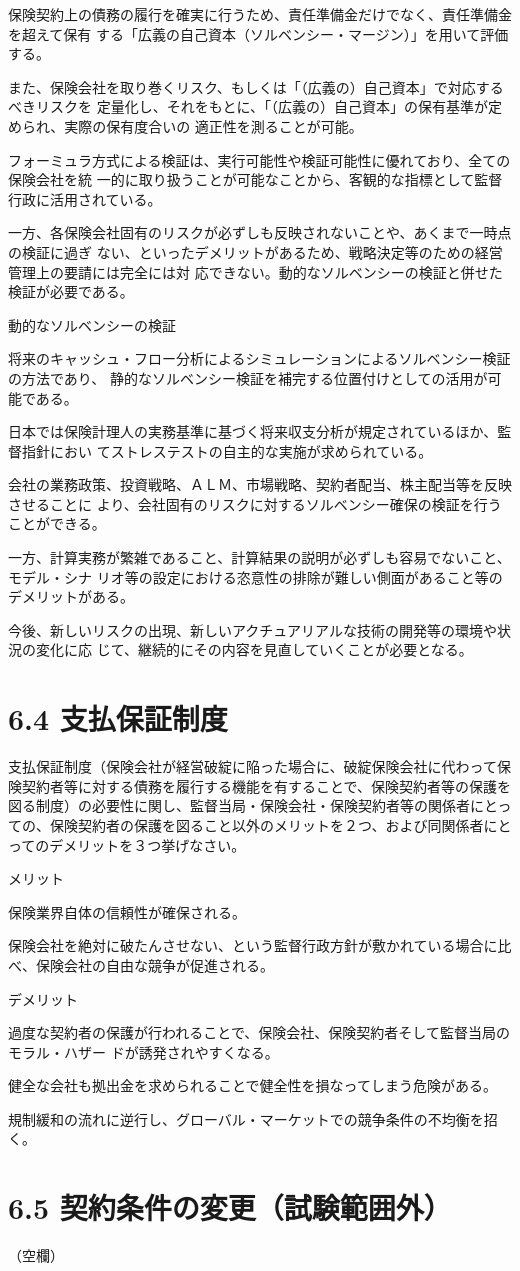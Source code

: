 \documentclass[report,gutter=10mm,fore-edge=10mm,uplatex,dvipdfmx]{jlreq}
\begin{document}
保険契約上の債務の履行を確実に行うため、責任準備金だけでなく、責任準備金を超えて保有
する「広義の自己資本（ソルベンシー・マージン）」を用いて評価する。

また、保険会社を取り巻くリスク、もしくは「（広義の）自己資本」で対応するべきリスクを
定量化し、それをもとに、「（広義の）自己資本」の保有基準が定められ、実際の保有度合いの
適正性を測ることが可能。

フォーミュラ方式による検証は、実行可能性や検証可能性に優れており、全ての保険会社を統
一的に取り扱うことが可能なことから、客観的な指標として監督行政に活用されている。

一方、各保険会社固有のリスクが必ずしも反映されないことや、あくまで一時点の検証に過ぎ
ない、といったデメリットがあるため、戦略決定等のための経営管理上の要請には完全には対
応できない。動的なソルベンシーの検証と併せた検証が必要である。

動的なソルベンシーの検証

将来のキャッシュ・フロー分析によるシミュレーションによるソルベンシー検証の方法であり、
静的なソルベンシー検証を補完する位置付けとしての活用が可能である。

日本では保険計理人の実務基準に基づく将来収支分析が規定されているほか、監督指針におい
てストレステストの自主的な実施が求められている。

会社の業務政策、投資戦略、ＡＬＭ、市場戦略、契約者配当、株主配当等を反映させることに
より、会社固有のリスクに対するソルベンシー確保の検証を行うことができる。

一方、計算実務が繁雑であること、計算結果の説明が必ずしも容易でないこと、モデル・シナ
リオ等の設定における恣意性の排除が難しい側面があること等のデメリットがある。

今後、新しいリスクの出現、新しいアクチュアリアルな技術の開発等の環境や状況の変化に応
じて、継続的にその内容を見直していくことが必要となる。

\section{6.4 支払保証制度}
支払保証制度（保険会社が経営破綻に陥った場合に、破綻保険会社に代わって保険契約者等に対する債務を履行する機能を有することで、保険契約者等の保護を図る制度）の必要性に関し、監督当局・保険会社・保険契約者等の関係者にとっての、保険契約者の保護を図ること以外のメリットを２つ、および同関係者にとってのデメリットを３つ挙げなさい。
\answer{}

メリット

保険業界自体の信頼性が確保される。

保険会社を絶対に破たんさせない、という監督行政方針が敷かれている場合に比べ、保険会社の自由な競争が促進される。

デメリット

過度な契約者の保護が行われることで、保険会社、保険契約者そして監督当局のモラル・ハザー
ドが誘発されやすくなる。

健全な会社も拠出金を求められることで健全性を損なってしまう危険がある。

規制緩和の流れに逆行し、グローバル・マーケットでの競争条件の不均衡を招く。


\section{6.5 契約条件の変更（試験範囲外）}
（空欄）
\end{document}
